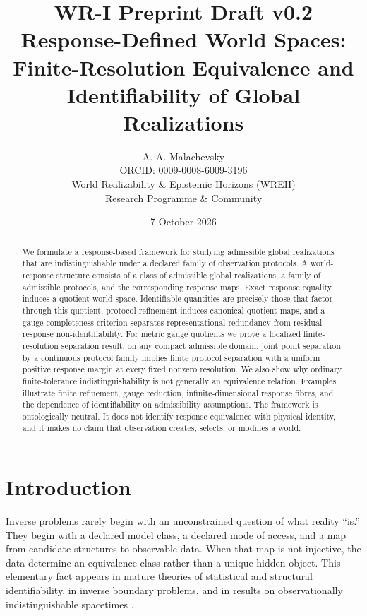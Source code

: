 \documentclass[11pt]{article}
\title{\textbf{WR-I Preprint Draft v0.2}\\[4pt]
\large Response-Defined World Spaces:\\
Finite-Resolution Equivalence and Identifiability of Global Realizations}
\author{A. A. Malachevsky\\
ORCID: 0009-0008-6009-3196\\
World Realizability \& Epistemic Horizons (WREH)\\
Research Programme \& Community}
\date{7 October 2026}
\begin{document}
\maketitle

\begin{abstract}
We formulate a response-based framework for studying admissible global
realizations that are indistinguishable under a declared family of observation
protocols. A world-response structure consists of a class of admissible global
realizations, a family of admissible protocols, and the corresponding response
maps. Exact response equality induces a quotient world space. Identifiable
quantities are precisely those that factor through this quotient, protocol
refinement induces canonical quotient maps, and a gauge-completeness criterion
separates representational redundancy from residual response
non-identifiability. For metric gauge quotients we prove a localized
finite-resolution separation result: on any compact admissible domain, joint
point separation by a continuous protocol family implies finite protocol
separation with a uniform positive response margin at every fixed nonzero
resolution. We also show why ordinary finite-tolerance indistinguishability is
not generally an equivalence relation. Examples illustrate finite refinement,
gauge reduction, infinite-dimensional response fibres, and the dependence of
identifiability on admissibility assumptions. The framework is ontologically
neutral. It does not identify response equivalence with physical identity, and
it makes no claim that observation creates, selects, or modifies a world.
\end{abstract}

\section{Introduction}

Inverse problems rarely begin with an unconstrained question of what reality
``is.'' They begin with a declared model class, a declared mode of access, and
a map from candidate structures to observable data. When that map is not
injective, the data determine an equivalence class rather than a unique hidden
object. This elementary fact appears in mature theories of statistical and
structural identifiability, in inverse boundary problems, and in results on
observationally indistinguishable spacetimes
\cite{Rothenberg1971,Saccomani2003,Bellu2007,Villaverde2016,MeshkatSullivant2014,Manchak2009}.
\end{document}
